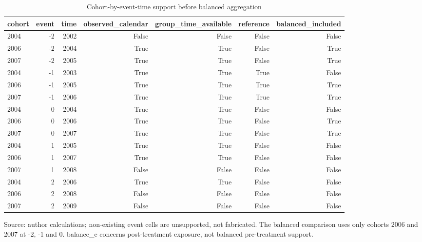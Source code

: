 \begin{table}[htbp]
\centering
\footnotesize
\caption{Cohort-by-event-time support before balanced aggregation}
\begin{tabularx}{\linewidth}{Xrrrrrr}
\toprule
cohort & event & time & observed\_\allowbreak{}calendar & group\_\allowbreak{}time\_\allowbreak{}available & reference & balanced\_\allowbreak{}included \\
\midrule
2004 & -2 & 2002 & False & False & False & False \\
2006 & -2 & 2004 & True & True & False & True \\
2007 & -2 & 2005 & True & True & False & True \\
2004 & -1 & 2003 & True & True & True & False \\
2006 & -1 & 2005 & True & True & True & True \\
2007 & -1 & 2006 & True & True & True & True \\
2004 & 0 & 2004 & True & True & False & False \\
2006 & 0 & 2006 & True & True & False & True \\
2007 & 0 & 2007 & True & True & False & True \\
2004 & 1 & 2005 & True & True & False & False \\
2006 & 1 & 2007 & True & True & False & False \\
2007 & 1 & 2008 & False & False & False & False \\
2004 & 2 & 2006 & True & True & False & False \\
2006 & 2 & 2008 & False & False & False & False \\
2007 & 2 & 2009 & False & False & False & False \\
\bottomrule
\end{tabularx}
\par\vspace{3pt}\begin{minipage}{\linewidth}\footnotesize Source: author calculations; non-existing event cells are unsupported, not fabricated.\allowbreak{} The balanced comparison uses only cohorts 2006 and 2007 at -2, -1 and 0.\allowbreak{} balance\_\allowbreak{}e concerns post-treatment exposure, not balanced pre-treatment support.\allowbreak{}\end{minipage}
\end{table}
